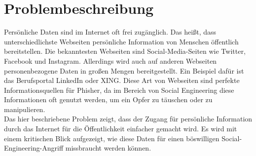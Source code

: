 

\chapter{Problembeschreibung}  %
\label{cha:Problemspezifikation} %
Persönliche Daten sind im Internet oft frei zugänglich. Das heißt, dass unterschiedlichste Webseiten persönliche Information von Menschen öffentlich bereitstellen. Die bekanntesten Webseiten sind Social-Media-Seiten wie Twitter, Facebook und Instagram. Allerdings wird auch auf anderen Webseiten personenbezogene Daten in großen Mengen bereitgestellt. Ein Beispiel dafür ist das Berufsportal LinkedIn oder XING. Diese Art von Webseiten sind perfekte Informationsquellen für Phisher, da im Bereich von Social Engineering diese Informationen oft genutzt werden, um ein Opfer zu täuschen oder zu manipulieren.\\
Das hier beschriebene Problem zeigt, dass der Zugang für persönliche Information durch das Internet für die Öffentlichkeit einfacher gemacht wird. Es wird mit einem kritischen Blick aufgezeigt, wie diese Daten für einen böswilligen Social-Engineering-Angriff missbraucht werden können.
